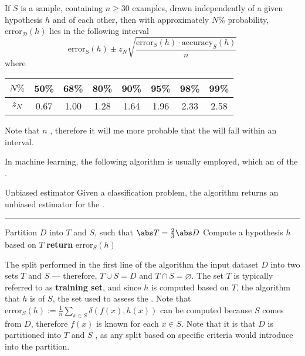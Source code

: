\documentclass[a4paper, 12pt]{report}
\begin{document}
    \begin{example}
        If $S$ is a sample, containing $n \ge 30$ examples, drawn independently of a given hypothesis $h$ and of each other, then with approximately $N\%$ probability, $\mathrm{error}_\mathcal D(h)$ lies in the following interval $$\mathrm{error}_S(h) \pm z_N \sqrt{\dfrac{\mathrm{error}_S(h) \cdot \mathrm{accuracy}_S(h)}{n}}$$ where
        \begin{table}[H]
            \centering
            \begin{tabular}{c|ccccccc}
                $N\%$ & 50\% & 68\% & 80\% & 90\% & 95\% & 98\% & 99\% \\
                \hline
                $z_N$ & 0.67 & 1.00 & 1.28 & 1.64 & 1.96 & 2.33 & 2.58
            \end{tabular}
        \end{table}

        Note that  $n$ , therefore it will me more probable that the  will fall within an interval.
    \end{example}

    In machine learning, the following algorithm is usually employed, which  an  of the .

    \begin{framedalgo}[label={unbiased_estimator}]{Unbiased estimator}
        Given a classification problem, the algorithm returns an unbiased estimator for the . \\
        \hrule
        \quad
        \label{unbiased_estimator}
        \begin{algorithmic}[1]
                \State Partition $D$ into $T$ and $S$, such that $\abs T = \frac{2}{3}\abs D$
                \State Compute a hypothesis $h$ based on $T$
                \State \textbf{return} $\mathrm{error}_S(h)$
            \EndFunction
        \end{algorithmic}
    \end{framedalgo}

    The split performed in the first line of the algorithm  the input dataset $D$ into two sets $T$ and $S$ --- therefore, $T \cup S = D$ and $T \cap S = \varnothing$. The set $T$ is typically referred to as \textbf{training set}, and since $h$ is computed based on $T$, the algorithm  that $h$ is  of $S$, the set used to assess the . Note that $\mathrm{error}_S(h) := \frac{1}{n} \sum_{x \in S}{\delta(f(x), h(x))}$ can be computed because $S$ comes from $D$, therefore $f(x)$ is known for each $x \in S$. Note that it is  that $D$ is partitioned into $T$ and $S$ , as any split based on specific criteria would introduce  into the partition.
\end{document}
